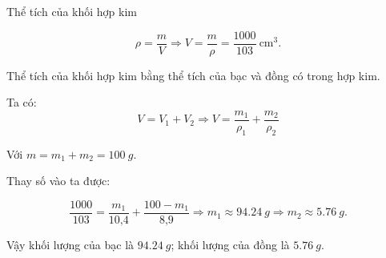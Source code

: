 \begin{enumerate}[label=\bfseries Câu \arabic*:]
{		Thể tích của khối hợp kim
		
		$$\rho = \dfrac{m}{V} \Rightarrow V = \dfrac{m}{\rho} = \dfrac{1000}{103}\ \text{cm}^3.$$
		
		Thể tích của khối hợp kim bằng thể tích của bạc và đồng có trong hợp kim.
		
		Ta có: $$V = V_1 + V_2 \Rightarrow V = \dfrac{m_1}{\rho_1} + \dfrac{m_2}{\rho_2}$$ 
		
		Với $m = m_1 + m_2 = \SI{100}{g}.$
		
		Thay số vào ta được:
		
		$$\dfrac{1000}{103} = \dfrac{m_1}{\text{10,4}} + \dfrac{100 - m_1}{\text{8,9}} \Rightarrow m_1 \approx \SI{94,24}{g} \Rightarrow m_2 \approx \SI{5,76}{g}.$$
		
		
		Vậy khối lượng của bạc là $\SI{94,24}{g}$; khối lượng của đồng là $\SI{5,76}{g}.$
	}
\end{enumerate}